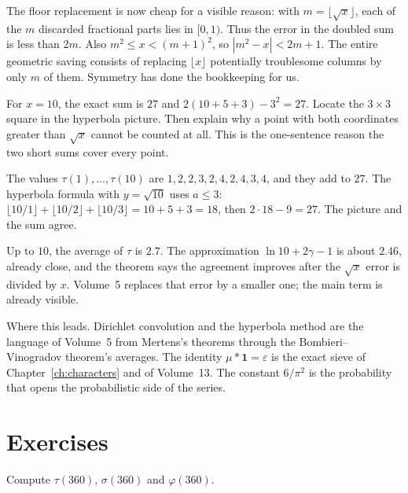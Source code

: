 The floor replacement is now cheap for a visible reason: with
$m=\lfloor\sqrt x\rfloor$, each of the $m$ discarded fractional parts lies
in $[0,1)$. Thus the error in the doubled sum is less than $2m$.
Also $m^2\le x<(m+1)^2$, so $|m^2-x|<2m+1$. The entire geometric
saving consists of replacing $\lfloor x\rfloor$ potentially troublesome
columns by only $m$ of them. Symmetry has done the bookkeeping for us.

\begin{think}
For $x=10$, the exact sum is $27$ and
$2(10+5+3)-3^2=27$. Locate the $3\times3$ square in the hyperbola picture.
Then explain why a point with both coordinates greater than $\sqrt x$ cannot
be counted at all. This is the one-sentence reason the two short sums cover
every point.
\end{think}

\begin{examplex}[the divisor sum at $x=10$]
The values $\tau(1),\ldots,\tau(10)$ are $1,2,2,3,2,4,2,4,3,4$, and they add to $27$.
The hyperbola formula with $y=\sqrt{10}$ uses $a\le 3$: $\lfloor 10/1\rfloor+\lfloor 10/2\rfloor+\lfloor 10/3\rfloor=10+5+3=18$, then $2\cdot 18-9=27$.
The picture and the sum agree.
\end{examplex}

\begin{examplex}
Up to $10$, the average of $\tau$ is $2.7$. The approximation $\ln 10+2\gamma-1$ is about $2.46$, already close, and the theorem says the agreement improves after the $\sqrt x$ error is divided by $x$. Volume~5 replaces that error by a smaller one; the main term is already visible.
\end{examplex}

\begin{beauty}
Where this leads. Dirichlet convolution and the hyperbola method are the language of Volume~5 from Mertens's theorems through the Bombieri--Vinogradov theorem's averages. The identity $\mu*\mathbf 1=\varepsilon$ is the exact sieve of Chapter~\ref{ch:characters} and of Volume~13. The constant $6/\pi^2$ is the probability that opens the probabilistic side of the series.
\end{beauty}

\section{Exercises}

\begin{exercise}[$\star$]\label{ex:360}
Compute $\tau(360)$, $\sigma(360)$ and $\varphi(360)$.
\end{exercise}

